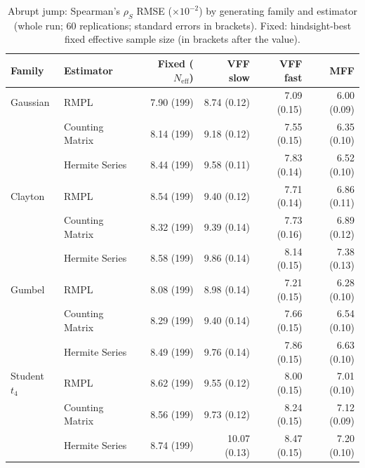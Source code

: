 \begin{table}[htbp]
\centering
\small
\caption{Abrupt jump: Spearman's $\rho_S$ RMSE ($\times10^{-2}$) by generating family and estimator (whole run; 60 replications; standard errors in brackets). Fixed: hindsight-best fixed effective sample size (in brackets after the value).}
\label{tab:app-strategy-rmse-jump}
\begin{tabular}{llrrrr}
\toprule
Family & Estimator & Fixed ($N_{\mathrm{eff}}$) & VFF slow & VFF fast & MFF \\
\midrule
Gaussian & RMPL & 7.90 (199) & 8.74 (0.12) & 7.09 (0.15) & 6.00 (0.09) \\
 & Counting Matrix & 8.14 (199) & 9.18 (0.12) & 7.55 (0.15) & 6.35 (0.10) \\
 & Hermite Series & 8.44 (199) & 9.58 (0.11) & 7.83 (0.14) & 6.52 (0.10) \\
\addlinespace
Clayton & RMPL & 8.54 (199) & 9.40 (0.12) & 7.71 (0.14) & 6.86 (0.11) \\
 & Counting Matrix & 8.32 (199) & 9.39 (0.14) & 7.73 (0.16) & 6.89 (0.12) \\
 & Hermite Series & 8.58 (199) & 9.86 (0.14) & 8.14 (0.15) & 7.38 (0.13) \\
\addlinespace
Gumbel & RMPL & 8.08 (199) & 8.98 (0.14) & 7.21 (0.15) & 6.28 (0.10) \\
 & Counting Matrix & 8.29 (199) & 9.40 (0.14) & 7.66 (0.15) & 6.54 (0.10) \\
 & Hermite Series & 8.49 (199) & 9.76 (0.14) & 7.86 (0.15) & 6.63 (0.10) \\
\addlinespace
Student $t_4$ & RMPL & 8.62 (199) & 9.55 (0.12) & 8.00 (0.15) & 7.01 (0.10) \\
 & Counting Matrix & 8.56 (199) & 9.73 (0.12) & 8.24 (0.15) & 7.12 (0.09) \\
 & Hermite Series & 8.74 (199) & 10.07 (0.13) & 8.47 (0.15) & 7.20 (0.10) \\
\bottomrule
\end{tabular}
\end{table}

